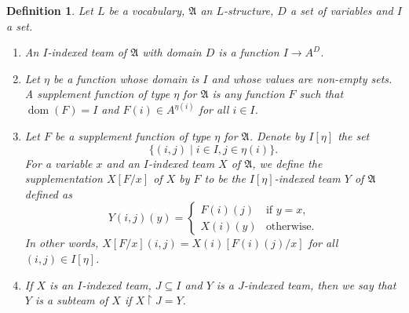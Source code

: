 \documentclass[10pt,a4paper]{amsart}
\newtheorem{definition}{Definition}[section]
\newcommand{\A}{\mathfrak{A}}
\DeclareMathOperator{\dom}{dom}
\begin{document}
\begin{definition}
    Let $L$ be a vocabulary, $\A$ an $L$-structure, $D$ a set of variables and $I$ a set.
    \begin{enumerate}
        \item An \emph{$I$-indexed team} of $\A$ with domain $D$ is a function $I\to A^D$.
        \item Let $\eta$ be a function whose domain is $I$ and whose values are non-empty sets. A \emph{supplement function} of type $\eta$ for $\A$ is any function $F$ such that $\dom(F) = I$ and $F(i)\in A^{\eta(i)}$ for all $i\in I$.
        \item Let $F$ be a supplement function of type $\eta$ for $\A$. Denote by $I[\eta]$ the set
        \[
            \{ (i,j) \mid i\in I, j\in\eta(i) \}.
        \]
        For a variable $x$ and an $I$-indexed team $X$ of $\A$, we define the supplementation $X[F/x]$ of $X$ by $F$ to be the $I[\eta]$-indexed team $Y$ of $\A$ defined as
        \[
            Y(i,j)(y) =
            \begin{cases}
                F(i)(j) & \text{if $y = x$}, \\
                X(i)(y) & \text{otherwise}.
            \end{cases}
        \]
        In other words, $X[F/x](i,j) = X(i)[F(i)(j)/x]$ for all $(i,j)\in I[\eta]$.
        \item If $X$ is an $I$-indexed team, $J\subseteq I$ and $Y$ is a $J$-indexed team, then we say that $Y$ is a subteam of $X$ if $X\restriction J = Y$.
    \end{enumerate}
\end{definition}
\end{document}
